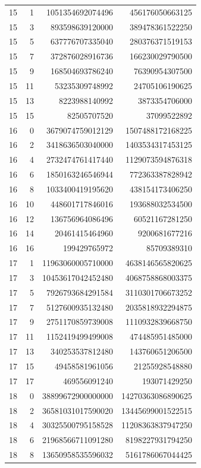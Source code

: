 \begin{longtable}{@{}rrrr@{}}
15 & 1 & 1051354692074496 & 456176050663125\\
15 & 3 & 893598639120000 & 389478361522250\\
15 & 5 & 637776707335040 & 280376371519153\\
15 & 7 & 372876028916736 & 166230029790500\\
15 & 9 & 168504693786240 & 76390954307500\\
15 & 11 & 53235309748992 & 24705106190625\\
15 & 13 & 8223988140992 & 3873354706000\\
15 & 15 & 82505707520 & 37099522892\\
16 & 0 & 3679074759012129 & 1507488172168225\\
16 & 2 & 3418636503040000 & 1403534317453125\\
16 & 4 & 2732474761417440 & 1129073594876318\\
16 & 6 & 1850163246546944 & 772363387828942\\
16 & 8 & 1033400419195620 & 438154173406250\\
16 & 10 & 448601717846016 & 193688032534500\\
16 & 12 & 136756964086496 & 60521167281250\\
16 & 14 & 20461415464960 & 9200681677216\\
16 & 16 & 199429765972 & 85709389310\\
17 & 1 & 11963060005710000 & 4638146565820625\\
17 & 3 & 10453617042452480 & 4068758868003375\\
17 & 5 & 7926793684291584 & 3110301706673252\\
17 & 7 & 5127600935132480 & 2035818932294875\\
17 & 9 & 2751170859739008 & 1110932839668750\\
17 & 11 & 1152419499499008 & 474485951485000\\
17 & 13 & 340253537812480 & 143760651206500\\
17 & 15 & 49458581961056 & 21255928548880\\
17 & 17 & 469556091240 & 193071429250\\
18 & 0 & 38899672900000000 & 14270363086890625\\
18 & 2 & 36581031017590020 & 13445699001522515\\
18 & 4 & 30325500795158528 & 11208363837947250\\
18 & 6 & 21968566711091280 & 8198227931794250\\
18 & 8 & 13650958535596032 & 5161786067044425\\

\end{longtable}
